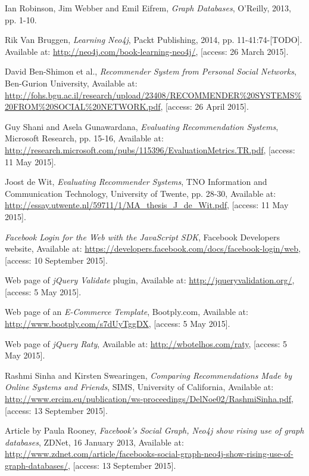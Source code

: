 \documentclass[12pt]{report}
\begin{document}
\begin{thebibliography}{99}
Ian Robinson, Jim Webber and Emil Eifrem, \textit{Graph Databases}, O'Reilly, 2013, pp. 1-10.

Rik Van Bruggen, \textit{Learning Neo4j}, Packt Publishing, 2014, pp. 11-41:74-[TODO]. Available at: \url{http://neo4j.com/book-learning-neo4j/}, [access: 26 March 2015].

David Ben-Shimon et al., \textit{Recommender System from Personal Social Networks}, Ben-Gurion University, Available at: \url{http://fohs.bgu.ac.il/research/upload/23408/RECOMMENDER%20SYSTEMS%20FROM%20SOCIAL%20NETWORK.pdf}, [access: 26 April 2015].

Guy Shani and Asela Gunawardana, \textit{Evaluating Recommendation Systems}, Microsoft Research, pp. 15-16, Available at: \url{http://research.microsoft.com/pubs/115396/EvaluationMetrics.TR.pdf}, [access: 11 May 2015].

Joost de Wit, \textit{Evaluating Recommender Systems}, TNO Information and Communication Technology, University of Twente, pp. 28-30, Available at: \url{http://essay.utwente.nl/59711/1/MA_thesis_J_de_Wit.pdf}, [access: 11 May 2015].

\textit{Facebook Login for the Web with the JavaScript SDK}, Facebook Developers website, Available at: \url{https://developers.facebook.com/docs/facebook-login/web}, [access: 10 September 2015].

Web page of \textit{jQuery Validate} plugin, Available at: \url{http://jqueryvalidation.org/}, [access: 5 May 2015].

Web page of an \textit{E-Commerce Template}, Bootply.com, Available at: \url{http://www.bootply.com/s7dUyTggDX}, [access: 5 May 2015].

Web page of \textit{jQuery Raty}, Available at: \url{http://wbotelhos.com/raty}, [access: 5 May 2015].

Rashmi Sinha and Kirsten Swearingen, \textit{Comparing Recommendations Made by Online Systems and Friends}, SIMS, University of California, Available at: \url{http://www.ercim.eu/publication/ws-proceedings/DelNoe02/RashmiSinha.pdf}, [access: 13 September 2015].

Article by Paula Rooney, \textit{Facebook's Social Graph, Neo4j show rising use of graph databases}, ZDNet, 16 January 2013, Available at: \url{http://www.zdnet.com/article/facebooks-social-graph-neo4j-show-rising-use-of-graph-databases/}, [access: 13 September 2015].

\end{thebibliography}

\listoffigures

\listoftables
\end{document}

